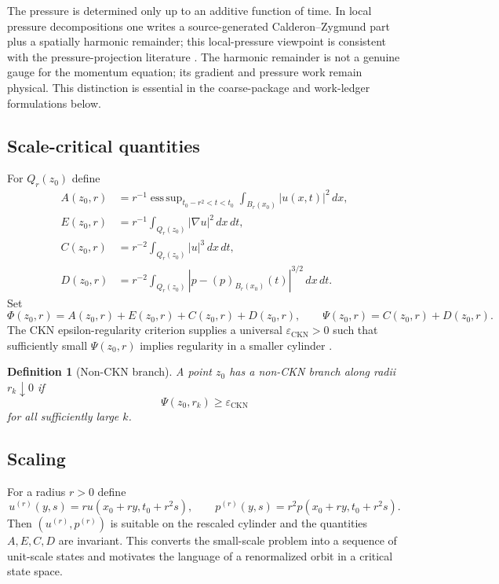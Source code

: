 \documentclass[11pt]{article}
\numberwithin{equation}{section}
\newtheorem{definition}[theorem]{Definition}
\theoremstyle{remark}
\DeclareMathOperator*{\esssup}{ess\,sup}
\newcommand{\eps}{\varepsilon}
\newcommand{\CKN}{\mathrm{CKN}}
\newcommand{\dx}{\,dx}
\newcommand{\dxdt}{\,dx\,dt}
\newcommand{\abs}[1]{\left|#1\right|}
\begin{document}
The pressure is determined only up to an additive function of time. In local pressure decompositions one writes a source-generated Calderon--Zygmund part plus a spatially harmonic remainder; this local-pressure viewpoint is consistent with the pressure-projection literature \cite{Wolf2017}. The harmonic remainder is not a genuine gauge for the momentum equation; its gradient and pressure work remain physical. This distinction is essential in the coarse-package and work-ledger formulations below.

\subsection{Scale-critical quantities}

For $Q_r(z_0)$ define
\begin{align}
A(z_0,r)&=r^{-1}\esssup_{t_0-r^2<t<t_0}\int_{B_r(x_0)}|u(x,t)|^2\dx,\\
E(z_0,r)&=r^{-1}\int_{Q_r(z_0)}|\nabla u|^2\dxdt,\\
C(z_0,r)&=r^{-2}\int_{Q_r(z_0)}|u|^3\dxdt,\\
D(z_0,r)&=r^{-2}\int_{Q_r(z_0)}
\abs{p-(p)_{B_r(x_0)}(t)}^{3/2}\dxdt.
\end{align}
Set
\begin{equation}\label{eq:PsiPhi}
\Phi(z_0,r)=A(z_0,r)+E(z_0,r)+C(z_0,r)+D(z_0,r),
\qquad
\Psi(z_0,r)=C(z_0,r)+D(z_0,r).
\end{equation}
The CKN epsilon-regularity criterion supplies a universal $\eps_{\CKN}>0$ such that sufficiently small $\Psi(z_0,r)$ implies regularity in a smaller cylinder \cite{CKN1982,Lin1998,Seregin2015}.

\begin{definition}[Non-CKN branch]
A point $z_0$ has a non-CKN branch along radii $r_k\downarrow0$ if
\[
\Psi(z_0,r_k)\ge \eps_{\CKN}
\]
for all sufficiently large $k$.
\end{definition}

\subsection{Scaling}

For a radius $r>0$ define
\begin{equation}\label{eq:NS-scaling}
u^{(r)}(y,s)=r u(x_0+ry,t_0+r^2s),
\qquad
p^{(r)}(y,s)=r^2p(x_0+ry,t_0+r^2s).
\end{equation}
Then $(u^{(r)},p^{(r)})$ is suitable on the rescaled cylinder and the quantities $A,E,C,D$ are invariant. This converts the small-scale problem into a sequence of unit-scale states and motivates the language of a renormalized orbit in a critical state space.
\end{document}
